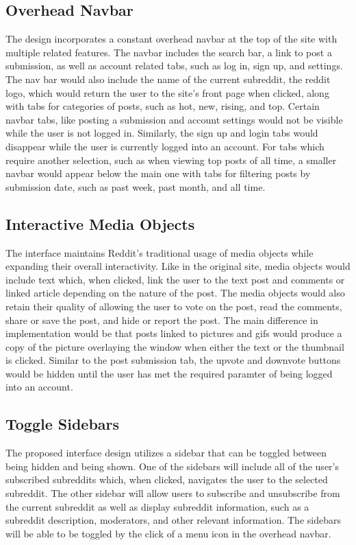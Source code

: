 \documentclass{article}
\begin{document}
\subsection{Overhead Navbar} The design incorporates a constant overhead navbar at the top of the site with multiple related features. The navbar includes the search bar, a link to post a submission, as well as account related tabs, such as log in, sign up, and settings. The nav bar would also include the name of the current subreddit, the reddit logo, which would return the user to the site's front page when clicked, along with tabs for categories of posts, such as hot, new, rising, and top. Certain navbar tabs, like posting a submission and account settings would not be visible while the user is not logged in. Similarly, the sign up and login tabs would disappear while the user is currently logged into an account. For tabs which require another selection, such as when viewing top posts of all time, a smaller navbar would appear below the main one with tabs for filtering posts by submission date, such as past week, past month, and all time.

\subsection{Interactive Media Objects} The interface maintains Reddit's traditional usage of media objects while expanding their overall interactivity. Like in the original site, media objects would include text which, when clicked, link the user to the text post and comments or linked article depending on the nature of the post. The media objects would also retain their quality of allowing the user to vote on the post, read the comments, share or save the post, and hide or report the post. The main difference in implementation would be that posts linked to pictures and gifs would produce a copy of the picture overlaying the window when either the text or the thumbnail is clicked. Similar to the post submission tab, the upvote and downvote buttons would be hidden until the user has met the required paramter of being logged into an account.

\subsection{Toggle Sidebars} The proposed interface design utilizes a sidebar that can be toggled between being hidden and being shown. One of the sidebars will include all of the user's subscribed subreddits which, when clicked, navigates the user to the selected subreddit. The other sidebar will allow users to subscribe and unsubscribe from the current subreddit as well as display subreddit information, such as a subreddit description, moderators, and other relevant information. The sidebars will be able to be toggled by the click of a menu icon in the overhead navbar.
\end{document}
